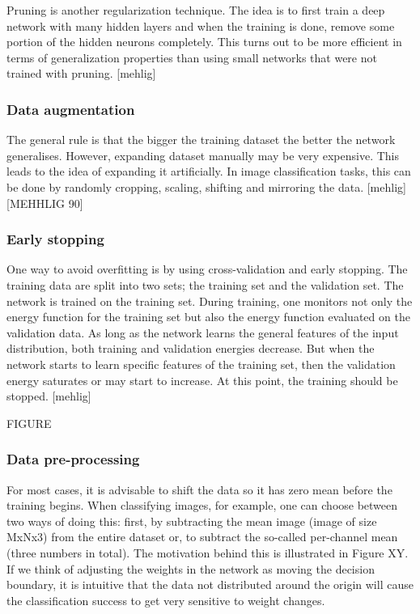 Pruning is another regularization technique. The idea is to first train a deep network with many hidden layers and when the training is done, remove some portion of the hidden neurons completely. This turns out to be more efficient in terms of generalization properties than using small networks that were not trained with pruning. [mehlig]

\subsubsection{Data augmentation}

The general rule is that the bigger the training dataset the better the network generalises. However, expanding dataset manually may be very expensive. This leads to the idea of expanding it artificially. In image classification tasks, this can be done by randomly cropping, scaling, shifting and mirroring the data. [mehlig]
[MEHHLIG 90]

\subsubsection{Early stopping}
One way to avoid overfitting is by using cross-validation and early stopping. The training data are split into two sets; the training set and the validation set. The network is trained on the training set. During training, one monitors not only the energy function for the training set but also the energy function evaluated on the validation data. As long as the network learns the general features of the input distribution, both training and validation energies decrease. But when the network starts to learn specific features of the training set, then the validation energy saturates or may start to increase. At this point, the training should be stopped. [mehlig]

FIGURE

\subsubsection{Data pre-processing}

For most cases, it is advisable to shift the data so it has zero mean before the training begins. When classifying images, for example, one can choose between two ways of doing this: first, by subtracting the mean image (image of size MxNx3) from the entire dataset or, to subtract the so-called per-channel mean (three numbers in total). The motivation behind this is illustrated in Figure XY. If we think of adjusting the weights in the network as moving the decision boundary, it is intuitive that the data not distributed around the origin will cause the classification success to get very sensitive to weight changes.


